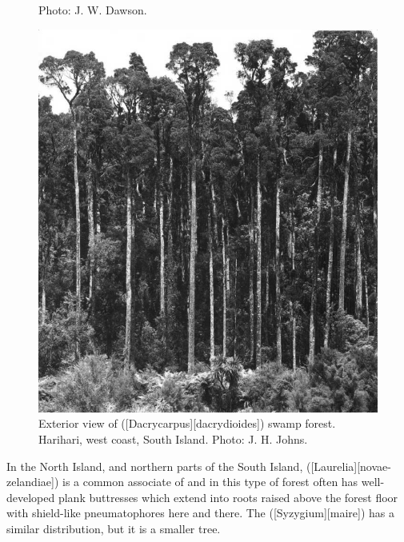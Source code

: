 \begin{figure}[t]
\begin{minipage}[t]{\textwidth}
\begin{minipage}[t]{(\textwidth-\fgap) * \real{0.395}}
{			Photo: J. W. Dawson.}%
			\label{fig:66cabbagetree}
		\end{minipage}\hspace{\fgap}%
		\begin{minipage}[t]{(\textwidth-\fgap) * \real{0.605}}
			\centering
			\includegraphics[width=\textwidth]{graphics/fig_067}
			\caption[Exterior view of kahikatea swamp forest]{Exterior view of  ([Dacrycarpus][dacrydioides]) swamp forest.
			Harihari, west coast, South Island.
			Photo: J. H. Johns.}%
			\label{fig:67kahikatea}
		\end{minipage}
	\end{minipage}
\end{figure}
In the North Island, and northern parts of the South Island,  ([Laurelia][novae-zelandiae]) is a common associate of  and in this type of forest often has well-developed plank buttresses which extend into roots raised above the forest floor with shield-like pneumatophores here and there.
The  ([Syzygium][maire]) has a similar distribution, but it is a smaller tree.

